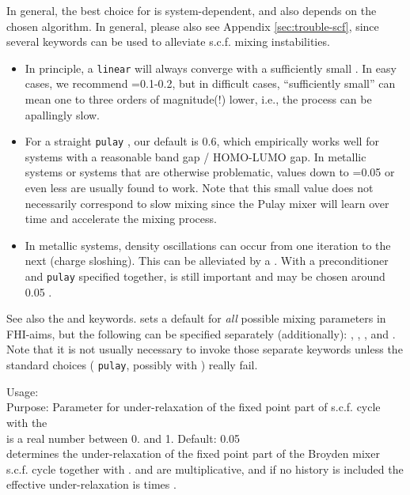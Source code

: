 In general, the best choice for  is system-dependent,
and also depends on the chosen  algorithm. In general,
please also see Appendix \ref{sec:trouble-scf}, since several keywords
can be used to alleviate s.c.f. mixing instabilities.
\begin{itemize}
  \item In principle, a \texttt{linear}  will always
    converge with a sufficiently small . In easy cases,
    we recommend =0.1-0.2, but in difficult cases,
    ``sufficiently small'' can mean one to three orders of magnitude(!)
    lower, i.e., the process can be apallingly slow.  
  \item For a straight \texttt{pulay} , our default
     is 0.6, which empirically works well for systems
    with a reasonable band gap / HOMO-LUMO gap. In metallic systems 
    or systems that are otherwise problematic, values down to 
    =0.05 or even less are usually found to work. Note that
    this small value does not necessarily correspond to slow mixing 
    since the Pulay mixer will learn over time and accelerate
    the mixing process.
  \item In metallic systems, density oscillations can occur from one
    iteration to the next (charge sloshing). This can be alleviated by
    a . With a preconditioner and
    \texttt{pulay}  specified together, 
    is still important and may be chosen around 0.05 .
\end{itemize}
See also the  and 
keywords.  sets a default for \emph{all}
possible mixing parameters in FHI-aims, but the following can be
specified separately (additionally):
, ,
, and . Note that
it is not usually necessary to 
invoke those separate keywords unless the standard choices
( \texttt{pulay}, possibly with
) really fail. 

{
  \noindent
  Usage:   \\[1.0ex]
  Purpose: Parameter for under-relaxation of the fixed point part of s.c.f. cycle with the   \\[1.0ex]
   is a real number between 0. and 1. Default: 0.05\\
}
 determines the under-relaxation of the fixed point part of the Broyden mixer s.c.f. cycle together with .
 and  are multiplicative, and if no history is included the effective under-relaxation is  times .

